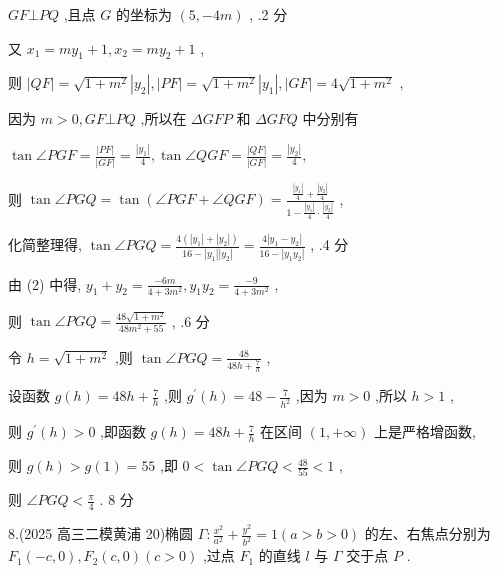 \documentclass[10pt]{article}
\begin{document}
\({GF} \bot  {PQ}\) ,且点 \(G\) 的坐标为 \(\left( {5, - {4m}}\right)\) , .2 分

又 \({x}_{1} = m{y}_{1} + 1,{x}_{2} = m{y}_{2} + 1\) ,

则 \(\left| {QF}\right|  = \sqrt{1 + {m}^{2}}\left| {y}_{2}\right| ,\left| {PF}\right|  = \sqrt{1 + {m}^{2}}\left| {y}_{1}\right| ,\left| {GF}\right|  = 4\sqrt{1 + {m}^{2}}\) ,

因为 \(m > 0,{GF} \bot  {PQ}\) ,所以在 \({\Delta GFP}\) 和 \({\Delta GFQ}\) 中分别有

\(\tan \angle {PGF} = \frac{\left| PF\right| }{\left| GF\right| } = \frac{\left| {y}_{1}\right| }{4},\tan \angle {QGF} = \frac{\left| QF\right| }{\left| GF\right| } = \frac{\left| {y}_{2}\right| }{4},\)

则 \(\tan \angle {PGQ} = \tan \left( {\angle {PGF} + \angle {QGF}}\right)  = \frac{\frac{\left| {y}_{1}\right| }{4} + \frac{\left| {y}_{2}\right| }{4}}{1 - \frac{\left| {y}_{1}\right| }{4} \cdot  \frac{\left| {y}_{2}\right| }{4}}\) ,

化简整理得, \(\tan \angle {PGQ} = \frac{4\left( {\left| {y}_{1}\right|  + \left| {y}_{2}\right| }\right) }{{16} - \left| {y}_{1}\right| \left| {y}_{2}\right| } = \frac{4\left| {{y}_{1} - {y}_{2}}\right| }{{16} - \left| {{y}_{1}{y}_{2}}\right| }\) , .4 分

由 (2) 中得, \({y}_{1} + {y}_{2} = \frac{-{6m}}{4 + 3{m}^{2}},{y}_{1}{y}_{2} = \frac{-9}{4 + 3{m}^{2}}\) ,

则 \(\tan \angle {PGQ} = \frac{{48}\sqrt{1 + {m}^{2}}}{{48}{m}^{2} + {55}}\) , .6 分

令 \(h = \sqrt{1 + {m}^{2}}\) ,则 \(\tan \angle {PGQ} = \frac{48}{{48h} + \frac{7}{h}}\) ,

设函数 \(g\left( h\right)  = {48h} + \frac{7}{h}\) ,则 \({g}^{\prime }\left( h\right)  = {48} - \frac{7}{{h}^{2}}\) ,因为 \(m > 0\) ,所以 \(h > 1\) ,

则 \({g}^{\prime }\left( h\right)  > 0\) ,即函数 \(g\left( h\right)  = {48h} + \frac{7}{h}\) 在区间 \(\left( {1, + \infty }\right)\) 上是严格增函数,

则 \(g\left( h\right)  > g\left( 1\right)  = {55}\) ,即 \(0 < \tan \angle {PGQ} < \frac{48}{55} < 1\) ,

则 \(\angle {PGQ} < \frac{\pi }{4}\) . 8 分

8.(2025 高三二模黄浦 20)椭圆 \(\Gamma  : \frac{{x}^{2}}{{a}^{2}} + \frac{{y}^{2}}{{b}^{2}} = 1\left( {a > b > 0}\right)\) 的左、右焦点分别为 \({F}_{1}\left( {-c,0}\right) ,{F}_{2}\left( {c,0}\right) \left( {c > 0}\right)\) ,过点 \({F}_{1}\) 的直线 \(l\) 与 \(\Gamma\) 交于点 \(P\) .
\end{document}
